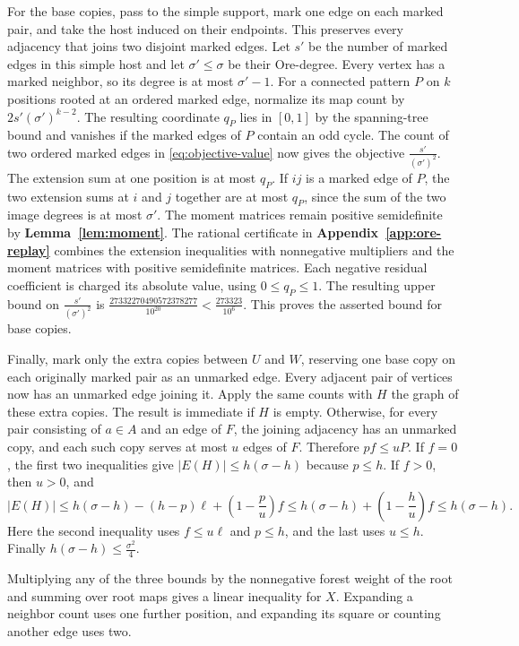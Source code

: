 \documentclass[preprint,11pt,numbers]{elsarticle-arxiv}
\numberwithin{equation}{section}
\theoremstyle{definition}
\begin{document}
For the base copies, pass to the simple support, mark one edge on
each marked pair, and take the host induced on their endpoints.
This preserves every adjacency that joins two disjoint marked edges.
Let $s'$ be the number of marked edges in this simple host and let
$\sigma'\leq\sigma$ be their Ore-degree. Every vertex has a marked
neighbor, so its degree is at most $\sigma'-1$. For a connected
pattern $P$ on $k$ positions rooted at an ordered marked edge,
normalize its map count by $2s'(\sigma')^{k-2}$. The resulting
coordinate $q_P$ lies in $[0,1]$ by the spanning-tree bound and
vanishes if the marked edges of $P$ contain an odd cycle.
The count of two ordered marked edges in \eqref{eq:objective-value}
now gives the objective $\frac{s'}{(\sigma')^2}$.
The extension sum at one position is at most $q_P$. If $ij$ is a
marked edge of $P$, the two extension sums at $i$ and $j$ together
are at most $q_P$, since the sum of the two image degrees is at
most $\sigma'$. The moment matrices remain positive semidefinite
by \textbf{Lemma~\ref{lem:moment}}. The rational certificate in
\textbf{Appendix~\ref{app:ore-replay}} combines the extension inequalities
with nonnegative multipliers and the moment matrices with
positive semidefinite matrices. Each negative residual coefficient
is charged its absolute value, using $0\leq q_P\leq1$. The resulting
upper bound on $\frac{s'}{(\sigma')^2}$ is
$\frac{27332270490572378277}{10^{20}}<\frac{273323}{10^6}$.
This proves the asserted bound for base copies.

Finally, mark only the extra copies between $U$ and $W$, reserving
one base copy on each originally marked pair as an unmarked edge.
Every adjacent pair of vertices now has an unmarked edge joining it.
Apply the same counts with $H$ the graph of these extra copies.
The result is immediate if $H$ is empty. Otherwise, for
every pair consisting of $a\in A$ and an edge of $F$, the
joining adjacency has an unmarked copy, and each such copy serves
at most $u$ edges of $F$. Therefore $pf\leq uP$.
If $f=0$, the first two inequalities give $|E(H)|\leq
h(\sigma-h)$ because $p\leq h$. If $f>0$, then $u>0$, and
\[
 |E(H)|\leq h(\sigma-h)-(h-p)\ell+
          \left(1-\frac pu\right)f
 \leq h(\sigma-h)+\left(1-\frac hu\right)f
 \leq h(\sigma-h).
\]
Here the second inequality uses $f\leq u\ell$ and $p\leq h$,
and the last uses $u\leq h$. Finally $h(\sigma-h)\leq
\frac{\sigma^2}{4}$.

Multiplying any of the three bounds by the nonnegative forest
weight of the root and summing over root maps gives a linear
inequality for $X$. Expanding a neighbor count uses one further
position, and expanding its square or counting another edge uses
two.
\end{document}
